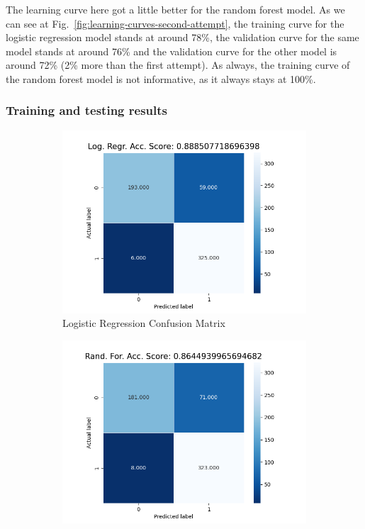 \documentclass[12pt, conference]{IEEEtran}
\begin{document}
The learning curve here got a little better for the random forest model. As we can see at Fig.~\ref{fig:learning-curves-second-attempt}, the training curve for the logistic regression model stands at around 78\%, the validation curve for the same model stands at around 76\% and the validation curve for the other model is around 72\% (2\% more than the first attempt). As always, the training curve of the random forest model is not informative, as it always stays at 100\%.

\subsubsection{Training and testing results}

\begin{figure}[t]
    \centering
    \begin{subfigure}[b]{.5\linewidth}
        \centering
        \includegraphics[width=\linewidth]{resources/confusion_matrix_in-out_features_logreg.png}
        \caption{Logistic Regression Confusion Matrix}
        \label{fig:confusion-matrix-second-attempt-randfor}
    \end{subfigure}%
    \begin{subfigure}[b]{.5\linewidth}
        \centering
        \includegraphics[width=\linewidth]{resources/confusion_matrix_in-out_features_randfor.png}

\end{subfigure}
\end{figure}
\end{document}
